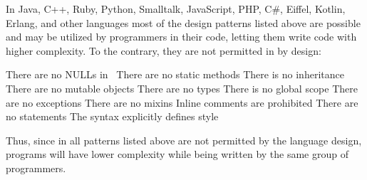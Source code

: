 In Java, C++, Ruby, Python, Smalltalk, JavaScript,
PHP, C\#, Eiffel, Kotlin, Erlang, and other languages most
of the design patterns listed above are possible and may be
utilized by programmers in their code, letting them write
code with higher complexity. To the contrary, they
are not permitted in \eo{} by design:

\begin{itemize}
 There are no NULLs in~\eo{}
 There are no static methods
 There is no inheritance
 There are no mutable objects
 There are no types
 There is no global scope
 There are no exceptions
 There are no mixins
 Inline comments are prohibited
 There are no statements
 The syntax explicitly defines style
\end{itemize}

Thus, since in \eo{} all patterns listed above
are not permitted by the language design, \eo{} programs
will have lower complexity while being written by the same group
of programmers.
